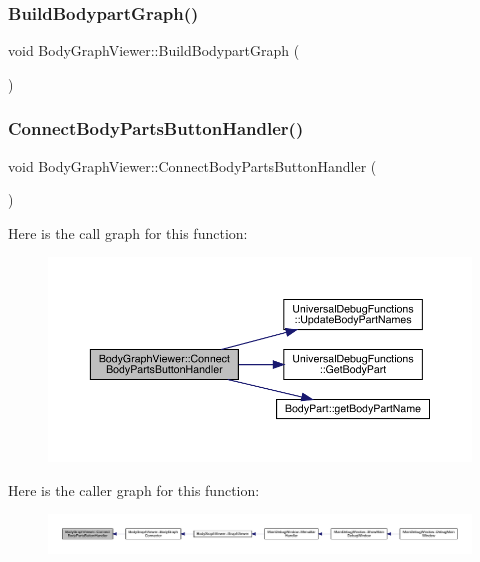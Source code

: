 \subsubsection{\texorpdfstring{Build\+Bodypart\+Graph()}{BuildBodypartGraph()}}
{\footnotesize\ttfamily void Body\+Graph\+Viewer\+::\+Build\+Bodypart\+Graph (\begin{DoxyParamCaption}{ }\end{DoxyParamCaption})}

\mbox{\label{namespace_body_graph_viewer_a9722a49a47d752678a7508ca1c10e6ad}} 
\subsubsection{\texorpdfstring{Connect\+Body\+Parts\+Button\+Handler()}{ConnectBodyPartsButtonHandler()}}
{\footnotesize\ttfamily void Body\+Graph\+Viewer\+::\+Connect\+Body\+Parts\+Button\+Handler (\begin{DoxyParamCaption}{ }\end{DoxyParamCaption})}

Here is the call graph for this function\+:
\nopagebreak
\begin{figure}[H]
\begin{center}
\leavevmode
\includegraphics[width=350pt]{df/d9e/namespace_body_graph_viewer_a9722a49a47d752678a7508ca1c10e6ad_cgraph}
\end{center}
\end{figure}
Here is the caller graph for this function\+:
\nopagebreak
\begin{figure}[H]
\begin{center}
\leavevmode
\includegraphics[width=350pt]{df/d9e/namespace_body_graph_viewer_a9722a49a47d752678a7508ca1c10e6ad_icgraph}
\end{center}
\end{figure}
\mbox{\label{namespace_body_graph_viewer_ae8fa18b34d0a6c141c3257cdb7899f38}} 

